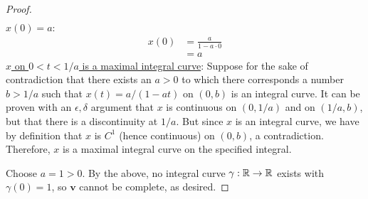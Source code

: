 \documentclass[../psets.tex]{subfiles}
\begin{document}
\begin{enumerate}[label={\textbf{2.2.\roman*.}}]
\begin{proof}
\begin{align*}
        \end{align*}
        \underline{$x(0)=a$}:
        \begin{align*}
            x(0) &= \frac{a}{1-a\cdot 0}\\
            &= a
        \end{align*}
        \underline{$x$ on $0<t<1/a$ is a maximal integral curve}: Suppose for the sake of contradiction that there exists an $a>0$ to which there corresponds a number $b>1/a$ such that $x(t)=a/(1-at)$ on $(0,b)$ is an integral curve. It can be proven with an $\epsilon,\delta$ argument that $x$ is continuous on $(0,1/a)$ and on $(1/a,b)$, but that there is a discontinuity at $1/a$. But since $x$ is an integral curve, we have by definition that $x$ is $C^1$ (hence continuous) on $(0,b)$, a contradiction. Therefore, $x$ is a maximal integral curve on the specified integral.\par
        Choose $a=1>0$. By the above, no integral curve $\gamma:\mathbb{R}\to\mathbb{R}$ exists with $\gamma(0)=1$, so $\bm{v}$ cannot be complete, as desired.
    \end{proof}
\end{enumerate}
\end{document}
